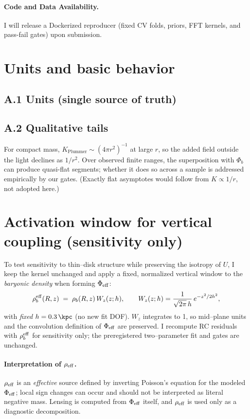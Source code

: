 		\paragraph{Code and Data Availability.}
		I will release a Dockerized reproducer (fixed CV folds, priors, FFT kernels, and pass-fail gates) upon submission.
		
		\appendix
		
		\section{Units and basic behavior}\label{app:units}
		\subsection*{A.1 Units (single source of truth)}
		
		\subsection*{A.2 Qualitative tails}
		For compact mass, $K_{\text{Plummer}}\sim (4\pi r^2)^{-1}$ at large $r$, so the added field outside the light declines as $1/r^2$. Over observed finite ranges, the superposition with $\Phi_b$ can produce quasi-flat segments; whether it does so across a sample is addressed empirically by our gates. (Exactly flat asymptotes would follow from $K\!\propto\!1/r$, not adopted here.)
		
		\section{Activation window for vertical coupling (sensitivity only)}\label{app:thin}
		To test sensitivity to thin--disk structure while preserving the isotropy of $U$, I keep the kernel unchanged and apply a fixed, normalized vertical window to the \emph{baryonic density} when forming $\Phi_{\rm eff}$:
		\[
		\rho_b^{\rm eff}(R,z) \;=\; \rho_b(R,z)\,W_z(z;h),
		\qquad
		W_z(z;h)=\frac{1}{\sqrt{2\pi}\,h}\,e^{-z^2/2h^2},
		\]
		with \emph{fixed} $h=\SI{0.3}{\kpc}$ (no new fit DOF). $W_z$ integrates to 1, so mid--plane units and the convolution definition of $\Phi_{\rm eff}$ are preserved. I recompute RC residuals with $\rho_b^{\rm eff}$ for sensitivity only; the preregistered two--parameter fit and gates are unchanged.
		\paragraph{Interpretation of $\rho_{\rm eff}$.}
		$\rho_{\rm eff}$ is an \emph{effective} source defined by inverting Poisson’s equation for the modeled $\Phi_{\rm eff}$; local sign changes can occur and should not be interpreted as literal negative mass. Lensing is computed from $\Phi_{\rm eff}$ itself, and $\rho_{\rm eff}$ is used only as a diagnostic decomposition.
		
